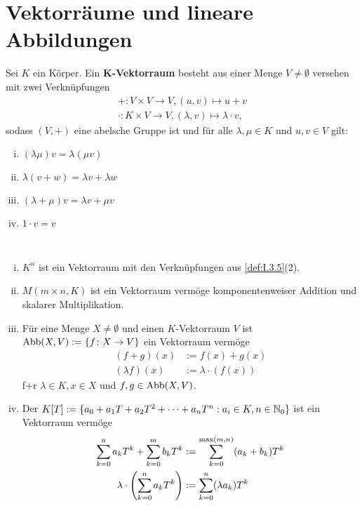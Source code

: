 \section{Vektorräume und lineare Abbildungen}
\begin{definition}[Vektorraum]
	\label{def:I.5.1}
	Sei $K$ ein Körper.
	Ein $\bm{K}$\textbf{-Vektorraum} besteht aus einer Menge $V \neq \emptyset$ versehen mit zwei Verknüpfungen 
	\begin{align*}
		+\colon V \times V \rightarrow V, (u,v) \mapsto u+v \\
		\cdot \colon K \times V \rightarrow V, (\lambda,v) \mapsto \lambda \cdot v,
	\end{align*}
	sodass $(V,+)$ eine abelsche Gruppe ist und für alle $\lambda, \mu \in K$ und $u,v \in V$ gilt:
	\begin{enumerate}[(i)]
		\item $(\lambda \mu) v = \lambda (\mu v)$
		\item $\lambda(v+w) = \lambda v + \lambda w$
		\item $(\lambda + \mu) v = \lambda v + \mu v$
		\item $1 \cdot v = v$
	\end{enumerate}
\end{definition}

\begin{beispiel}
	\label{bsp:I.5.2}
	\mbox{} \\[-1.4cm]
	\begin{enumerate}[(i)]
		\item $K^n$ ist ein Vektorraum mit den Verknüpfungen aus \autoref{def:I.3.5}(2).
		\item $M(m \times n,K)$ ist ein Vektorraum vermöge komponentenweiser Addition und skalarer Multiplikation.
		\item Für eine Menge $X \neq \emptyset$ und einen $K$-Vektorraum $V$ ist $\operatorname{Abb}(X,V) := \{f \colon X \rightarrow V\}$ ein Vektorraum vermöge
		\begin{align*}
			(f+g)(x) &:= f(x) + g(x) \\
			(\lambda f)(x) &:= \lambda \cdot (f(x))
		\end{align*}
		f+r $\lambda \in K, x \in X$ und $f,g \in \operatorname{Abb}(X,V)$.
		\item Der  $K[T] := \{a_0 + a_1 T + a_2 T^2 + \dots + a_n T^n : a_i \in K, n \in \mathbb{N}_0\}$ ist ein Vektorraum vermöge
		\begin{align*}
			\sum_{k=0}^{n} a_kT^k + \sum_{k=0}^{m} b_kT^k &:= \sum_{k=0}^{\max(m,n)} (a_k + b_k)T^k \\
			\lambda \cdot \left(\sum_{k=0}^{n} a_kT^k\right) &:= \sum_{k=0}^{n} (\lambda a_k)T^k
		\end{align*}
	\end{enumerate}	
\end{beispiel}

